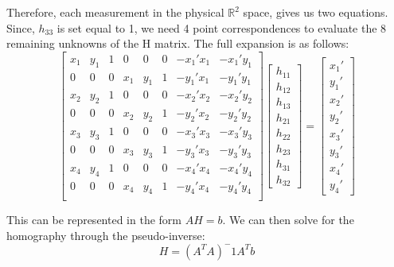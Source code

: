 \documentclass{article}
\begin{document}
Therefore, each measurement in the physical $\mathbb{R}^2$ space, gives us two equations. Since, $h_33$ is set equal to 1, we need 4 point correspondences to evaluate the 8 remaining unknowns of the H matrix. The full expansion is as follows:
\[\begin{bmatrix}
    x_1 & y_1 & 1 & 0 & 0 & 0 & -x_1'x_1 & -x_1'y_1 \\
    0 & 0 & 0 & x_1 & y_1 & 1 & -y_1'x_1 & -y_1'y_1 \\
    x_2 & y_2 & 1 & 0 & 0 & 0 & -x_2'x_2 & -x_2'y_2 \\
    0 & 0 & 0 & x_2 & y_2 & 1 & -y_2'x_2 & -y_2'y_2 \\
    x_3 & y_3 & 1 & 0 & 0 & 0 & -x_3'x_3 & -x_3'y_3 \\
    0 & 0 & 0 & x_3 & y_3 & 1 & -y_3'x_3 & -y_3'y_3 \\
    x_4 & y_4 & 1 & 0 & 0 & 0 & -x_4'x_4 & -x_4'y_4 \\
    0 & 0 & 0 & x_4 & y_4 & 1 & -y_4'x_4 & -y_4'y_4 \\
\end{bmatrix} \begin{bmatrix}
    h_{11} \\ h_{12} \\ h_{13} \\ h_{21} \\ h_{22} \\ h_{23} \\ h_{31} \\ h_{32}
\end{bmatrix} = \begin{bmatrix}
    x_1' \\ y_1' \\ x_2' \\ y_2' \\ x_3' \\ y_3' \\ x_4' \\ y_4'
\end{bmatrix}\]

This can be represented in the form $A H = b$. We can then solve for the homography through the pseudo-inverse:
\[H = (A^T A)^-1 A^T b\]
\end{document}
